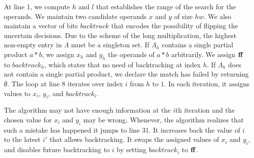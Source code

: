 At line 1, we compute $h$ and $l$ that establishes the range of the
search for the operands.
%
We maintain two candidate operands $x$ and $y$ of size $hw$.
%
We also maintain a vector of bits $backtrack$ that encodes 
the possibility of flipping the uncertain decisions.
%
Due to the scheme of the long multiplication, the highest
non-empty entry in $\Lambda$ must be a singleton set.
%
If $\Lambda_h$ contains a single partial product $a*b$,
we assign $x_h$ and $y_h$ the operands of $a*b$ arbitrarily.
%
We assign $\mathbf{ff}$ to $backtrack_h$, which states that
no need of backtracking at index $h$.
%
If $\Lambda_h$ does not contain a single partial product,
we declare the match has failed by returning $\emptyset$.
%
The loop at line 8 iterates over index $i$ from $h$ to $1$.
%
In each iteration, it assigns values to $x_i$, $y_i$, and $backtrack_i$. 
%

The algorithm may not have enough information at the $i$th iteration
and the chosen value for $x_i$ and $y_i$ may be wrong.
%
Whenever, the algorithm realizes that such a mistake has happened
it jumps to line 31.
%
It increases back the value of $i$ to the latest $i'$ that allows
backtracking.
%
It swaps the assigned values of $x_i$ and $y_i$, and disables future
backtracking to $i$ by setting $backtrack_i$ to
$\mathbf{ff}$.
%

